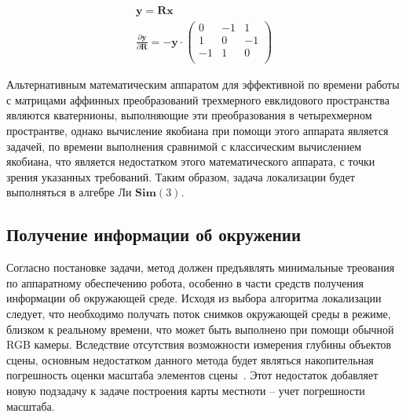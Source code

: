 \begin{itemize}
    \begin{equation}
        \begin{align*}
            \mathbf{y} = \mathbf{R}\mathbf{x} \\
            \frac{\partial\mathbf{y}}{\partial\mathbf{R}}
            = -\mathbf{y} \cdot
            \begin{pmatrix}
            0 & -1 & 1 \\
            1 & 0 & -1 \\
            -1 & 1 & 0 \\
            \end{pmatrix}
        \end{align*}
    \end{equation}
\end{itemize}


Альтернативным математическим аппаратом для эффективной по времени работы с матрицами аффинных преобразований трехмерного евклидового пространства являются кватернионы, выполняющие эти преобразования в четырехмерном пространтве, однако вычисление якобиана при помощи этого аппарата является задачей, по времени выполнения сравнимой с классическим вычислением якобиана, что является недостатком этого математического аппарата, с точки зрения указанных требований. Таким образом, задача локализации будет выполняться в алгебре Ли $\textbf{Sim}(3)$.


\subsection{Получение информации об окружении}
Согласно постановке задачи, метод должен предъявлять минимальные треования по аппаратному обеспечению робота, особенно в части средств получения информации об окружающей среде. Исходя из выбора алгоритма локализации следует, что необходимо получать поток снимков окружающей среды в режиме, близком к реальному времени, что может быть выполнено при помощи обычной RGB камеры. Вследствие отсутствия возможности измерения глубины объектов сцены, основным недостатком данного метода будет являться накопительная погрешность оценки масштаба элементов сцены~\cite{tum3DMonoSLAM}. Этот недостаток добавляет новую подзадачу к задаче построения карты местноти -- учет погрешности масштаба.


